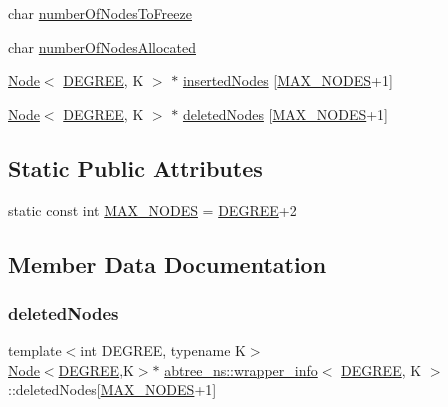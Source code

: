 \begin{DoxyCompactItemize}
\item 
char \hyperlink{classabtree__ns_1_1wrapper__info_a6f82a59bb872ece248f3a6603404f289}{number\+Of\+Nodes\+To\+Freeze}
\item 
char \hyperlink{classabtree__ns_1_1wrapper__info_aa902b7a21461bae3975b67ba4f39a6c6}{number\+Of\+Nodes\+Allocated}
\item 
\hyperlink{structabtree__ns_1_1Node}{Node}$<$ \hyperlink{brown__sigouin__abtree__kcas_2adapter_8h_a5d88b17d70c985f2f2b8e987037fd6dd}{D\+E\+G\+R\+EE}, K $>$ $\ast$ \hyperlink{classabtree__ns_1_1wrapper__info_a195b04f001a1df664ccf438f289a6990}{inserted\+Nodes} \mbox{[}\hyperlink{classabtree__ns_1_1wrapper__info_a8ebdd932eb6c4c88615fbb76b8419d9e}{M\+A\+X\+\_\+\+N\+O\+D\+ES}+1\mbox{]}
\item 
\hyperlink{structabtree__ns_1_1Node}{Node}$<$ \hyperlink{brown__sigouin__abtree__kcas_2adapter_8h_a5d88b17d70c985f2f2b8e987037fd6dd}{D\+E\+G\+R\+EE}, K $>$ $\ast$ \hyperlink{classabtree__ns_1_1wrapper__info_a33d0c34514ac8443085ae78e5702fd15}{deleted\+Nodes} \mbox{[}\hyperlink{classabtree__ns_1_1wrapper__info_a8ebdd932eb6c4c88615fbb76b8419d9e}{M\+A\+X\+\_\+\+N\+O\+D\+ES}+1\mbox{]}
\end{DoxyCompactItemize}
\subsection*{Static Public Attributes}
\begin{DoxyCompactItemize}
\item 
static const int \hyperlink{classabtree__ns_1_1wrapper__info_a8ebdd932eb6c4c88615fbb76b8419d9e}{M\+A\+X\+\_\+\+N\+O\+D\+ES} = \hyperlink{brown__sigouin__abtree__kcas_2adapter_8h_a5d88b17d70c985f2f2b8e987037fd6dd}{D\+E\+G\+R\+EE}+2
\end{DoxyCompactItemize}


\subsection{Member Data Documentation}
\mbox{\label{classabtree__ns_1_1wrapper__info_a33d0c34514ac8443085ae78e5702fd15}} 
\subsubsection{\texorpdfstring{deleted\+Nodes}{deletedNodes}}
{\footnotesize\ttfamily template$<$int D\+E\+G\+R\+EE, typename K$>$ \\
\hyperlink{structabtree__ns_1_1Node}{Node}$<$\hyperlink{brown__sigouin__abtree__kcas_2adapter_8h_a5d88b17d70c985f2f2b8e987037fd6dd}{D\+E\+G\+R\+EE},K$>$$\ast$ \hyperlink{classabtree__ns_1_1wrapper__info}{abtree\+\_\+ns\+::wrapper\+\_\+info}$<$ \hyperlink{brown__sigouin__abtree__kcas_2adapter_8h_a5d88b17d70c985f2f2b8e987037fd6dd}{D\+E\+G\+R\+EE}, K $>$\+::deleted\+Nodes\mbox{[}\hyperlink{classabtree__ns_1_1wrapper__info_a8ebdd932eb6c4c88615fbb76b8419d9e}{M\+A\+X\+\_\+\+N\+O\+D\+ES}+1\mbox{]}}

